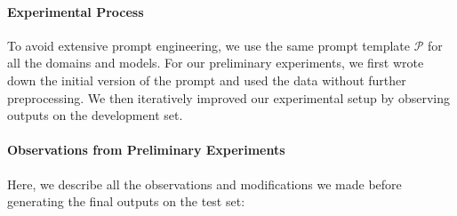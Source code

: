 \paragraph{Experimental Process}
\label{sec:quintd:process}
To avoid extensive prompt engineering, we use the same prompt template $\mathcal{P}$ for all the domains and models. For our preliminary experiments, we first wrote down the initial version of the prompt and used the data without further preprocessing.
We then iteratively improved our experimental setup by observing outputs on the development set.


\paragraph{Observations from Preliminary Experiments}
\label{sec:quintd:observations}
Here, we describe all the observations and modifications we made before generating the final outputs on the test set:

